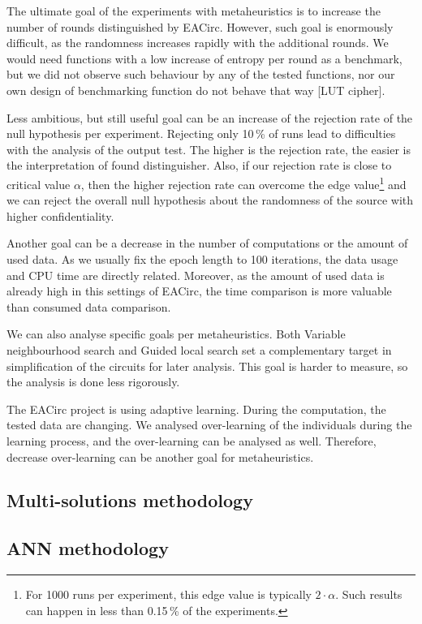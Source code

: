 \documentclass[
  print, %
  Table,   %
  nolof,     %
  nolot,     %
  11pt, %
  oneside  %
]{fithesis3}
\begin{document}
The ultimate goal of the experiments with metaheuristics is to increase the number of rounds distinguished by EACirc. However, such goal is enormously difficult, as the randomness increases rapidly with the additional rounds. We would need functions with a low increase of entropy per round as a benchmark, but we did not observe such behaviour by any of the tested functions, nor our own design of benchmarking function do not behave that way [LUT cipher].

Less ambitious, but still useful goal can be an increase of the rejection rate of the null hypothesis per experiment. Rejecting only 10\,\% of runs lead to difficulties with the analysis of the output test. The higher is the rejection rate, the easier is the interpretation of found distinguisher. Also, if our rejection rate is close to critical value $\alpha$, then the higher rejection rate can overcome the edge value\footnote{For 1000 runs per experiment, this edge value is typically $2\cdot\alpha$. Such results can happen in less than 0.15\,\% of the experiments.} and we can reject the overall null hypothesis about the randomness of the source with higher confidentiality.

Another goal can be a decrease in the number of computations or the amount of used data. As we usually fix the epoch length to 100 iterations, the data usage and CPU time are directly related. Moreover, as the amount of used data is already high in this settings of EACirc, the time comparison is more valuable than consumed data comparison.

We can also analyse specific goals per metaheuristics. Both Variable neighbourhood search and Guided local search set a complementary target in simplification of the circuits for later analysis. This goal is harder to measure, so the analysis is done less rigorously.

The EACirc project is using adaptive learning. During the computation, the tested data are changing. We analysed over-learning of the individuals during the learning process, and the over-learning can be analysed as well. Therefore, decrease over-learning can be another goal for metaheuristics.

\subsection{Multi-solutions methodology}
\subsection{ANN methodology}
\end{document}
